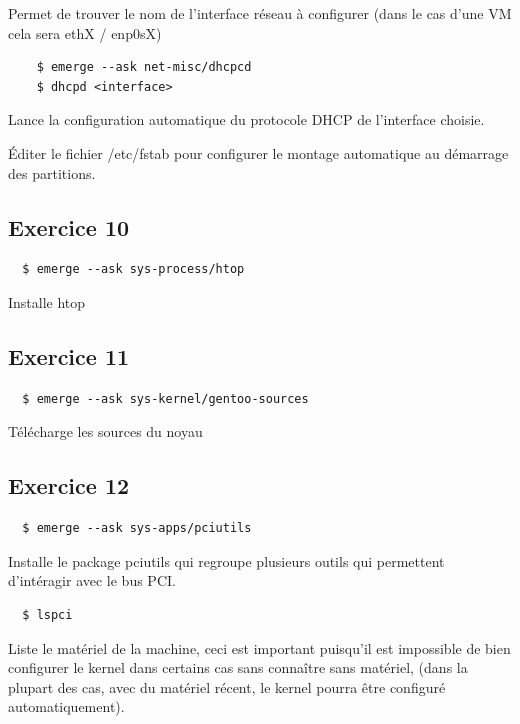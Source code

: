 \documentclass{report}
\begin{document}
Permet de trouver le nom de l'interface réseau à configurer (dans le cas d'une VM cela sera ethX / enp0sX)

\begin{tcolorbox}
  \begin{verbatim}
    $ emerge --ask net-misc/dhcpcd
    $ dhcpd <interface>
  \end{verbatim}
\end{tcolorbox}

Lance la configuration automatique du protocole DHCP de l'interface choisie.


Éditer le fichier /etc/fstab pour configurer le montage automatique au démarrage des partitions.

\newpage
\subsection{Exercice 10}
\begin{tcolorbox}
  \begin{verbatim}
  $ emerge --ask sys-process/htop
  \end{verbatim}
\end{tcolorbox}
Installe htop

\subsection{Exercice 11}
\begin{tcolorbox}
  \begin{verbatim}
  $ emerge --ask sys-kernel/gentoo-sources
  \end{verbatim}
\end{tcolorbox}
Télécharge les sources du noyau

\subsection{Exercice 12}
\begin{tcolorbox}
  \begin{verbatim}
  $ emerge --ask sys-apps/pciutils
  \end{verbatim}
\end{tcolorbox}
Installe le package pciutils qui regroupe plusieurs outils qui permettent d'intéragir avec le bus PCI.
\begin{tcolorbox}
  \begin{verbatim}
  $ lspci
  \end{verbatim}
\end{tcolorbox}
Liste le matériel de la machine, ceci est important puisqu'il est impossible de bien configurer le kernel dans certains cas sans connaître
sans matériel, (dans la plupart des cas, avec du matériel récent, le kernel pourra être configuré automatiquement).
\end{document}
